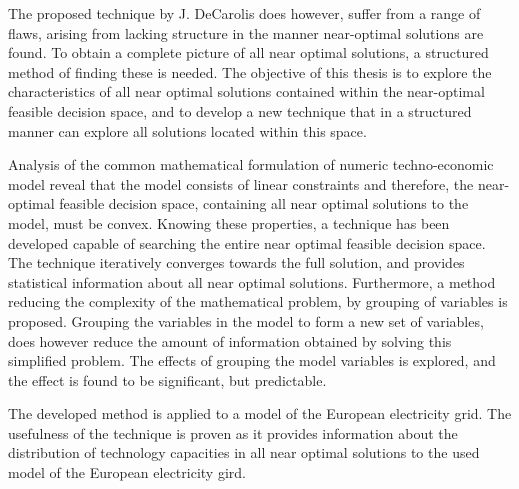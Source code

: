 \begin{adjustwidth}{-10pt}{-20pt}
The proposed technique by J. DeCarolis does however, suffer from a range of flaws, arising from lacking structure in the manner near-optimal solutions are found. To obtain a complete picture of all near optimal solutions, a structured method of finding these is needed. 
The objective of this thesis is to explore the characteristics of all near optimal solutions contained within the near-optimal feasible decision space, and to develop a new technique that in a structured manner can explore all solutions located within this space.  


Analysis of the common mathematical formulation of numeric techno-economic model reveal that the model consists of linear constraints and therefore, the near-optimal feasible decision space, containing all near optimal solutions to the model, must be convex. 
Knowing these properties, a technique has been developed capable of searching the entire near optimal feasible decision space. The technique iteratively converges towards the full solution, and provides statistical information about all near optimal solutions. 
Furthermore, a method reducing the complexity of the mathematical problem, by grouping of variables is proposed. Grouping the variables in the model to form a new set of variables, does however reduce the amount of information obtained by solving this simplified problem. The effects of grouping the model variables is explored, and the effect is found to be significant, but predictable. 

The developed method is applied to a model of the European electricity grid. The usefulness of the technique is proven as it provides information about the distribution of technology capacities in all near optimal solutions to the used model of the European electricity gird. 



\end{adjustwidth}






